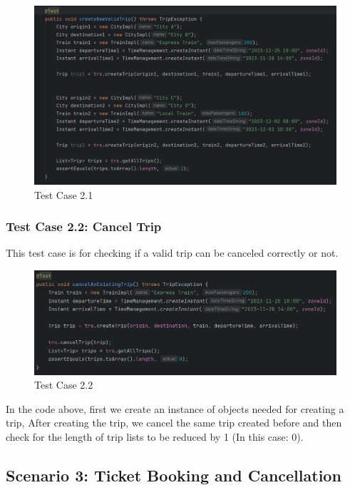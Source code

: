 \documentclass{article}
\begin{document}
\begin{figure}[h]
  \centering
  \includegraphics[width=1.0\textwidth]{pictures/T2-1.png}
  \caption{Test Case 2.1}
  \label{fig:your_label}
\end{figure}

\pagebreak

\subsubsection{Test Case 2.2: Cancel Trip}
This test case is for checking if a valid trip can be canceled correctly or not. 

\begin{figure}[h]
  \centering
  \includegraphics[width=1.0\textwidth]{pictures/T2-2.png}
  \caption{Test Case 2.2}
  \label{fig:your_label}
\end{figure}

In the code above, first we create an instance of objects needed for creating a trip, After creating the trip, we cancel the same trip created before and then check for the length of trip lists to be reduced by 1 (In this case: 0).

\pagebreak

\subsection{Scenario 3: Ticket Booking and Cancellation}
\end{document}
